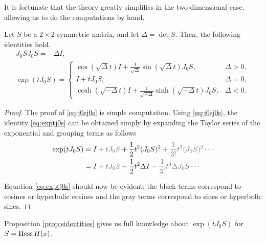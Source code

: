 It is fortunate that the theory greatly simplifies in the two-dimensional case, allowing us to do the computations by hand.

\begin{prop}\label{prop:sidentities}
Let $S$ be a $2 \times 2$ symmetric matrix, and let $\Delta = \det S$. Then, the following identities hold.
\begin{gather}
J_0 S J_0 S = - \Delta I, \label{eq:j0sj0s}\\
\exp(t J_0 S) = \begin{cases}
\cos(\sqrt{\Delta} t) I + \frac1{\sqrt{\Delta}} \sin(\sqrt{\Delta} t) J_0 S, & \Delta > 0,\\
I + t J_0 S, & \Delta = 0,\\
\cosh(\sqrt{-\Delta} t) I + \frac1{\sqrt{-\Delta}} \sinh(\sqrt{-\Delta} t) J_0 S, & \Delta < 0.
\end{cases} \label{eq:exptj0s}
\end{gather}
\end{prop}

\begin{proof}
The proof of \eqref{eq:j0sj0s} is simple computation. Using \eqref{eq:j0sj0s}, the identity \eqref{eq:exptj0s} can be obtained simply by expanding the Taylor series of the exponential and grouping terms as follows
\begin{equation}
\begin{aligned}
\exp(t J_0 S) &= 
I \color{black!60} + t J_0 S \color{black} + \frac12 t^2 (J_0 S)^2 \color{black!60} +\frac1{3!} t^3 (J_0 S)^3 \color{black} \cdots \\
&= 
I \color{black!60} + t J_0 S \color{black} - \frac12 t^2 \Delta I \color{black!60} -\frac1{3!} t^3 \Delta J_0 S \color{black} \cdots
\end{aligned}
\end{equation}

Equation \eqref{eq:exptj0s} should now be evident: the black terms correspond to cosines or hyperbolic cosines and the gray terms correspond to sines or hyperbolic sines.
\end{proof}

Proposition \ref{prop:sidentities} gives us full knowledge about $\exp(t J_0 S)$ for $S = \operatorname{Hess} H(x)$.

